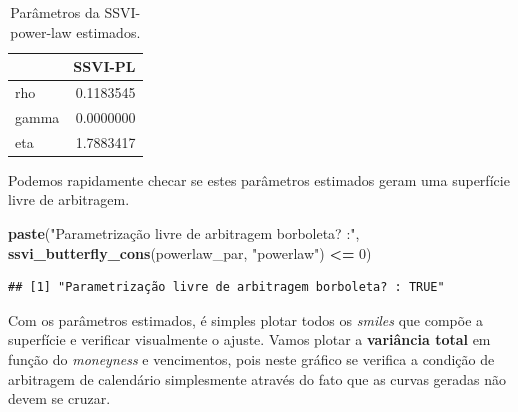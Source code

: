 \documentclass[]{book}
\newenvironment{Shaded}{\begin{snugshade}}{\end{snugshade}}
\newcommand{\DataTypeTok}[1]{\textcolor[rgb]{0.13,0.29,0.53}{#1}}
\newcommand{\DecValTok}[1]{\textcolor[rgb]{0.00,0.00,0.81}{#1}}
\newcommand{\KeywordTok}[1]{\textcolor[rgb]{0.13,0.29,0.53}{\textbf{#1}}}
\newcommand{\NormalTok}[1]{#1}
\newcommand{\OperatorTok}[1]{\textcolor[rgb]{0.81,0.36,0.00}{\textbf{#1}}}
\newcommand{\StringTok}[1]{\textcolor[rgb]{0.31,0.60,0.02}{#1}}
\theoremstyle{definition}
\theoremstyle{definition}
\theoremstyle{definition}
\theoremstyle{remark}
\begin{document}
\begin{Shaded}
\end{Shaded}

\begin{table}[t]

\caption{\label{tab:ssvi-cal}Parâmetros da SSVI-power-law estimados.}
\centering
\begin{tabular}{l|r}
\hline
  & SSVI-PL\\
\hline
rho & 0.1183545\\
\hline
gamma & 0.0000000\\
\hline
eta & 1.7883417\\
\hline
\end{tabular}
\end{table}

Podemos rapidamente checar se estes parâmetros estimados geram uma superfície livre de arbitragem.

\begin{Shaded}
\begin{Highlighting}[]
\KeywordTok{paste}\NormalTok{(}\StringTok{"Parametrização livre de arbitragem borboleta? :"}\NormalTok{, }
      \KeywordTok{ssvi_butterfly_cons}\NormalTok{(powerlaw_par, }\StringTok{"powerlaw"}\NormalTok{) }\OperatorTok{<=}\StringTok{ }\DecValTok{0}\NormalTok{)}
\end{Highlighting}
\end{Shaded}

\begin{verbatim}
## [1] "Parametrização livre de arbitragem borboleta? : TRUE"
\end{verbatim}

Com os parâmetros estimados, é simples plotar todos os \emph{smiles} que compõe a superfície e verificar visualmente o ajuste. Vamos plotar a \textbf{variância total} em função do \emph{moneyness} e vencimentos, pois neste gráfico se verifica a condição de arbitragem de calendário simplesmente através do fato que as curvas geradas não devem se cruzar.
\end{document}
